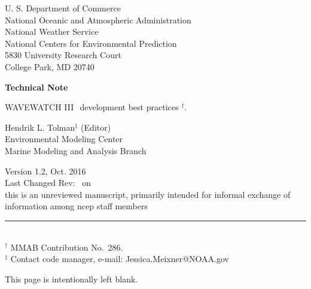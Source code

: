\documentclass[12pt]{article}
\newcommand{\wwt}{WAVEWATCH III$\:$\textsuperscript\textregistered}
\newcommand{\bpage}{\vfill \pagebreak \strut

\vspace{2.5in} \centerline{This page is intentionally left blank.}}
\begin{document}

\pagestyle{empty}

\strut \vspace{5mm}

\begin{center} 
U. S. Department of Commerce \\
National Oceanic and Atmospheric Administration \\
National Weather Service \\
National Centers for Environmental Prediction \\
5830 University Research Court \\
College Park, MD 20740

\vspace{15mm}

{\bf Technical Note}

\vspace{15mm}

{\large \wwt\ development best practices $^\dag$.} \\

\vspace{20mm}

Hendrik L. Tolman$^\ddag$ (Editor)
\\
Environmental Modeling Center \\
Marine Modeling and Analysis Branch

\vspace{25mm}

Version 1.2, Oct. 2016 %
\\ Last Changed Rev: \SVNRevision\ on \SVNDate \\
\vspace{\baselineskip}
\vfill {\sc this is an unreviewed manuscript, primarily
intended for informal exchange of information among ncep staff
members}

\end{center}
\noindent \rule{140mm}{0.5mm} \\
{\small $^\dag$ MMAB Contribution No.~286. \\
$^\ddag$ Contact code manager, e-mail: Jessica.Meixner@NOAA.gov} \\

\bpage

\pagebreak
\end{document}
